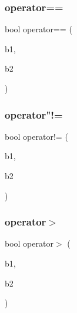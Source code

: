 \mbox{\label{class_a_e_s_byte_a4e20c22693525d6358618f3472d77552}} 
\subsubsection{\texorpdfstring{operator==}{operator==}}
{\footnotesize\ttfamily bool operator== (\begin{DoxyParamCaption}\item[{const \mbox{\hyperlink{class_a_e_s_byte}{A\+E\+S\+Byte}} \&}]{b1,  }\item[{const \mbox{\hyperlink{class_a_e_s_byte}{A\+E\+S\+Byte}} \&}]{b2 }\end{DoxyParamCaption})\hspace{0.3cm}{\ttfamily [friend]}}

\mbox{\label{class_a_e_s_byte_ae7ff002e111c7487a5f9e5f63f92b30a}} 
\subsubsection{\texorpdfstring{operator"!=}{operator!=}}
{\footnotesize\ttfamily bool operator!= (\begin{DoxyParamCaption}\item[{const \mbox{\hyperlink{class_a_e_s_byte}{A\+E\+S\+Byte}} \&}]{b1,  }\item[{const \mbox{\hyperlink{class_a_e_s_byte}{A\+E\+S\+Byte}} \&}]{b2 }\end{DoxyParamCaption})\hspace{0.3cm}{\ttfamily [friend]}}

\mbox{\label{class_a_e_s_byte_aa58238c585ec99b8af1f95349d013463}} 
\subsubsection{\texorpdfstring{operator$>$}{operator>}}
{\footnotesize\ttfamily bool operator$>$ (\begin{DoxyParamCaption}\item[{const \mbox{\hyperlink{class_a_e_s_byte}{A\+E\+S\+Byte}} \&}]{b1,  }\item[{const \mbox{\hyperlink{class_a_e_s_byte}{A\+E\+S\+Byte}} \&}]{b2 }\end{DoxyParamCaption})\hspace{0.3cm}{\ttfamily [friend]}}

